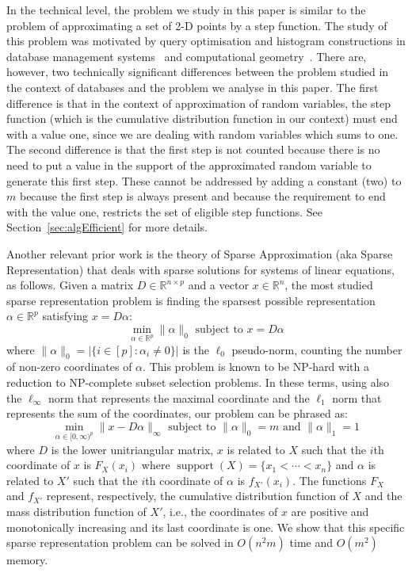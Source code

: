 \documentclass[letterpaper]{article} %
\DeclareMathOperator{\support}{support}
\begin{document}
In the technical level, the problem we study in this paper is similar to the problem of approximating a set of 2-D points by a step function. The study of this problem was motivated by query optimisation and histogram constructions in database management systems~\cite{applf12,applf13,applf14,applf17,applf18,Fournier2011} and computational geometry~\cite{diaz2001fitting,fournier2008fitting}. There are, however, two technically significant differences between the problem studied in the context of databases and the problem we analyse in this paper. The first difference is that in the context of approximation of random variables, the step function (which is the cumulative distribution function in our context)  must end with a value one, since we are dealing with random variables which sums to one. The second difference is that the first step is not counted because there is no need to put a value in the support of the approximated random variable to generate this first step. These cannot be addressed by adding a constant (two) to $m$ because the first step is always present and because the requirement to end with the value one, restricts the set of eligible step functions. See Section~\ref{sec:algEfficient} for more details.

Another relevant prior work is the theory of Sparse Approximation (aka Sparse Representation) that deals with sparse solutions for systems of linear equations, as follows. 
Given a matrix $D \in \mathbb{R}^{n \times p}$ and a vector $x \in \mathbb{R}^n$, the most studied sparse representation problem is finding the sparsest possible representation $\alpha \in \mathbb{R}^p$ satisfying $x = D\alpha$:
\[
\min_{\alpha \in \mathbb{R}^p} \|\alpha\|_0 \text{ subject to } x = D\alpha
\]
where $\|\alpha\|_0 = |\{ i \in [p]: \alpha_i \neq 0 \}|$ is the $\ell_0$ pseudo-norm, counting the number of non-zero coordinates of $\alpha$. This problem is known to be NP-hard with a reduction to NP-complete subset selection problems.
In these terms, using also the $\ell_\infty$ norm that represents the maximal coordinate and the $\ell_1$ norm that represents the sum of the coordinates, our problem can be phrased as:
\[
\min_{\alpha \in [0,\infty)^p}\|x - D\alpha\|_{\infty} \text{ subject to }  \|\alpha\|_0 = m \text{ and } \|\alpha\|_1=1
\]
where $D$ is the lower unitriangular matrix, $x$ is related to $X$ such that the $i$th coordinate of $x$ is $F_X(x_i)$ where $\support(X)=\{x_1 < \cdots < x_n\}$ and $\alpha$ is related to $X'$ such that the $i$th coordinate of $\alpha$ is $f_{X'}(x_i)$. The functions $F_X$ and $f_{X'}$ represent, respectively, the cumulative distribution function of $X$ and the mass distribution function of $X'$, i.e.,  the coordinates of $x$ are positive and monotonically increasing and its last coordinate is one. We show that this specific sparse representation problem can be solved in $O(n^2m)$ time and $O(m^2)$ memory.
\end{document}
